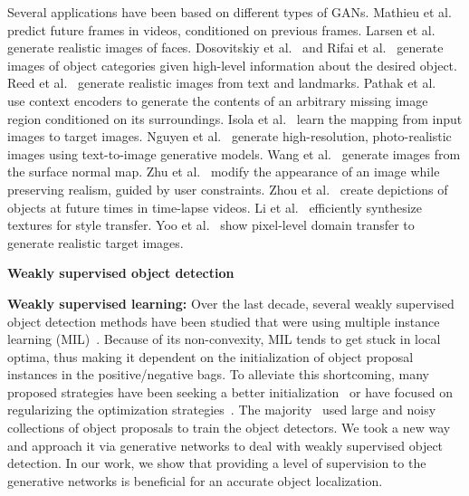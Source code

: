 \documentclass[runningheads]{llncs}
\begin{document}
Several applications have been based on different types of GANs. Mathieu et al.~\cite{mathieu} predict future frames in videos, conditioned on previous frames. Larsen et al.~\cite{larsen} generate realistic images of faces. Dosovitskiy et al.~\cite{dosovitskiy} and Rifai et al.~\cite{rifai} generate images of object categories given high-level information about the desired object. Reed et al.~\cite{reed2} generate realistic images from text and landmarks. Pathak et al.~\cite{pathak} use context encoders to generate the contents of an arbitrary missing image region conditioned on its surroundings. Isola et al.~\cite{isola} learn the mapping from input images to target images. Nguyen et al.~\cite{nguyen} generate high-resolution, photo-realistic images using text-to-image generative models. Wang et al.~\cite{cite39} generate images from the surface normal map. Zhu et al.~\cite{cite49} modify the appearance of an image while preserving realism, guided by user constraints. Zhou et al.~\cite{cite48}  create depictions of objects at future times in time-lapse videos. Li et al.~\cite{cite25} efficiently synthesize textures for style transfer. Yoo et al.~\cite{cite43} show pixel-level domain transfer to generate realistic target images. 



\textbf{Weakly supervised object detection}

\textbf{Weakly supervised learning:} Over the last decade, several weakly supervised object detection methods have been studied that were using multiple instance learning (MIL)~\cite{bilen14,bilen15,siva,song14}. Because of its non-convexity, MIL tends to get stuck in local optima, thus making it dependent on the initialization of object proposal instances in the positive/negative bags. To alleviate this shortcoming, many proposed strategies have been seeking a better initialization~\cite{does10,Siva12,siva,song14a} or have focused on regularizing the optimization strategies~\cite{bilen14,bilen15,cinbis}. The majority~\cite{reed14,sukh14} used large and noisy collections of object proposals to train the object detectors. We took a new way and approach it via generative networks to deal with weakly supervised object detection. In our work, we show that providing a level of supervision to the generative networks is beneficial for an accurate object localization. 

\iffalse
\textbf{Object proposal generation:}  Nguyen et al.~\cite{nguyen} and Pandey et al.~\cite{Pandey} extract densely sampled regions from an image using an initial bounding box.  Since, these methods were not able to generate enough proposals because of fixed aspect-ratio, size, and shape, approaches based on object saliency~\cite{does10,Siva12,siva} were proposed to extract region proposals. Currently, the most popular methods are based on (i) image saliency and objectness measures~\cite{alex10}, (ii) edge boxes using structural edges~\cite{zitnick2014edge}, (iii) segmentation-based algorithms like Selective search~\cite{SS} and Multiscale Combinatorial Grouping~\cite{arbelaez2014multiscale},  (iv) the geodesic distance transform~\cite{krahenbuhl2014geodesic},  (v) CNN based object proposals using Deep proposal ~\cite{ghodrati} and Region Proposal Networks~\cite{ren}.
\fi
\end{document}
